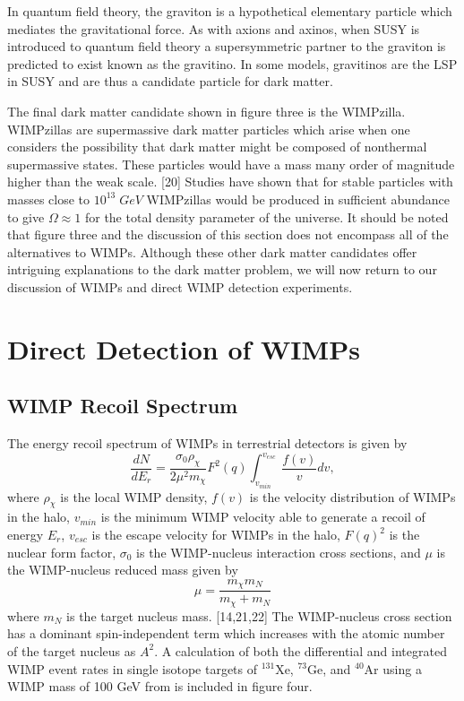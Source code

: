 \documentclass[a4paper,12pt]{article}
\begin{document}
In quantum field theory, the graviton is a hypothetical  elementary particle which mediates the gravitational force.  As with axions and axinos, when SUSY is introduced to quantum field theory a supersymmetric partner to the graviton is predicted to exist known as the gravitino.  In some models, gravitinos are the LSP in SUSY and are thus a candidate particle for dark matter.

The final dark matter candidate shown in figure three is the WIMPzilla.  WIMPzillas are supermassive dark matter particles which arise when one considers the possibility that dark matter might be composed of nonthermal supermassive states. These particles would have a mass many order of magnitude higher than the weak scale. [20] Studies have shown that for stable particles with masses close to $10^{13} \; GeV$  WIMPzillas would be produced in sufficient abundance to give $\Omega \approx 1$ for the total density parameter of the universe.  It should be noted that figure three and the discussion of this section does not encompass all of the alternatives to WIMPs.   Although these other dark matter candidates offer intriguing explanations to the dark matter problem, we will now return to our discussion of WIMPs and direct WIMP detection experiments.


\section{Direct Detection of WIMPs}

\subsection{WIMP Recoil Spectrum}
The energy recoil spectrum of WIMPs in terrestrial detectors is given by
\[\frac{dN}{dE_r}=\frac{\sigma_0 \rho_\chi}{2 \mu^2 m_\chi} F^2(q) \int_{v_{min}}^{v_{esc}} \frac{f(v)}{v} dv, \]
where $\rho_\chi$ is the local WIMP density, $f(v)$ is the velocity distribution of WIMPs in the halo, $v_{min}$ is the minimum WIMP velocity able to generate a recoil of energy $E_r$, $v_{esc}$ is the escape velocity for WIMPs in the halo, $F(q)^2$ is the nuclear form factor, $\sigma_0$ is the WIMP-nucleus interaction cross sections, and $\mu$ is the WIMP-nucleus reduced mass given by 
\[\mu=\frac{m_\chi m_N}{m_\chi + m_N}\]
where $m_N$ is the target nucleus mass. [14,21,22] The WIMP-nucleus cross section has a dominant spin-independent term which increases with the atomic number of the target nucleus as $A^2$.  A calculation of both the differential and integrated WIMP event rates in single isotope targets of  $^{131}$Xe, $^{73}$Ge, and $^{40}$Ar using a WIMP mass of 100 GeV from is included in figure four.
\end{document}
